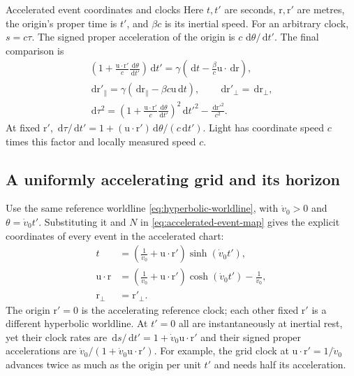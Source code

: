 \documentclass[11pt]{article}
\newcommand{\pv}[1]{{#1}}
\newcommand{\vstyle}[1]{{\bm{\mathrm{#1}}}}
\newcommand{\pN}{\pv{N}}
\numberwithin{equation}{section}
\newcommand{\dotprod}{\cdot}
\newcommand{\br}{\vstyle{r}}
\newcommand{\bu}{\vstyle{u}}
\newcommand{\dd}{\,\mathrm d}
\begin{document}
\begin{SIunits}{Accelerated event coordinates and clocks}
Here $t,t'$ are seconds, $\br,\br'$ are metres, the origin's proper time
is $t'$, and $\beta c$ is its inertial speed. For an arbitrary clock,
$s=c\tau$. The signed proper acceleration of the origin is
$c\,\dd\theta/\dd t'$. The final comparison is
\begin{gather*}
 \left(1+\frac{\bu\dotprod\br'}{c}\frac{\dd\theta}{\dd t'}\right)\dd t'
 =\gamma\left(\dd t-\frac{\beta}{c}\bu\dotprod\dd\br\right),\\
 \dd\br'_{\parallel}=\gamma(\dd\br_{\parallel}-\beta c\bu\dd t),
 \qquad \dd\br'_{\perp}=\dd\br_{\perp},\\
 \dd\tau^2
 =\left(1+\frac{\bu\dotprod\br'}{c}\frac{\dd\theta}{\dd t'}\right)^2\dd t'^2
 -\frac{\dd\br'^2}{c^2}.
\end{gather*}
At fixed $\br'$, $\dd\tau/\dd t'=1+(\bu\dotprod\br')\dd\theta/(c\dd t')$.
Light has coordinate speed $c$ times this factor and locally measured
speed $c$.
\end{SIunits}

\subsection{A uniformly accelerating grid and its horizon}
\label{sec:rindler-events}

Use the same reference worldline \eqref{eq:hyperbolic-worldline}, with
$\dot v_0>0$ and $\theta=\dot v_0t'$. Substituting it and $\pN$ in
\eqref{eq:accelerated-event-map} gives the explicit coordinates of every
event in the accelerated chart:
\begin{equation}
 \boxed{\begin{aligned}
 t&=\left(\frac1{\dot v_0}+\bu\dotprod\br'\right)\sinh(\dot v_0t'),\\
 \bu\dotprod\br
 &=\left(\frac1{\dot v_0}+\bu\dotprod\br'\right)\cosh(\dot v_0t')
 -\frac1{\dot v_0},\\
 \br_{\perp}&=\br'_{\perp}.
 \end{aligned}}
 \label{eq:rindler-event-map}
\end{equation}
The origin $\br'=0$ is the accelerating reference clock; each other
fixed $\br'$ is a different hyperbolic worldline. At $t'=0$ all are
instantaneously at inertial rest, yet their clock rates are
$\dd s/\dd t'=1+\dot v_0\bu\dotprod\br'$ and their signed proper
accelerations are $\dot v_0/(1+\dot v_0\bu\dotprod\br')$.
For example, the grid clock at $\bu\dotprod\br'=1/\dot v_0$ advances
twice as much as the origin per unit $t'$ and needs half its acceleration.
\end{document}
